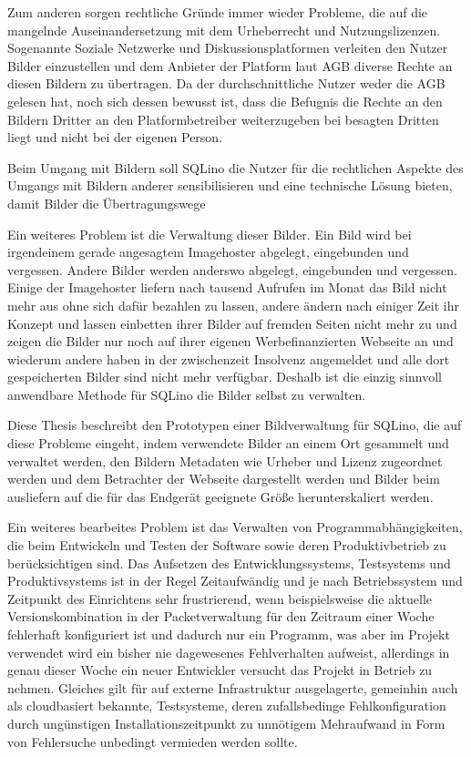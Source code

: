 Zum anderen sorgen rechtliche Gründe immer wieder Probleme, die auf die
mangelnde Auseinandersetzung mit dem Urheberrecht und Nutzungslizenzen.
Sogenannte Soziale Netzwerke und Diskussionsplatformen verleiten den Nutzer
Bilder einzustellen und dem Anbieter der Platform laut AGB diverse Rechte an
diesen Bildern zu übertragen. Da der durchschnittliche Nutzer weder die AGB
gelesen hat, noch sich dessen bewusst ist, dass die Befugnis die Rechte an den
Bildern Dritter an den Platformbetreiber weiterzugeben bei besagten Dritten
liegt und nicht bei der eigenen Person.

Beim Umgang mit Bildern soll SQLino die Nutzer für die rechtlichen Aspekte des
Umgangs mit Bildern anderer sensibilisieren und eine technische Lösung bieten,
damit Bilder die Übertragungswege 

Ein weiteres Problem ist die Verwaltung dieser Bilder. Ein Bild wird bei
irgendeinem gerade angesagtem Imagehoster abgelegt, eingebunden und vergessen.
Andere Bilder werden anderswo abgelegt, eingebunden und vergessen. Einige der
Imagehoster liefern nach tausend Aufrufen im Monat das Bild nicht mehr aus ohne
sich dafür bezahlen zu lassen, andere ändern nach einiger Zeit ihr Konzept und
lassen einbetten ihrer Bilder auf fremden Seiten nicht mehr zu und zeigen die
Bilder nur noch auf ihrer eigenen Werbefinanzierten Webseite an und wiederum
andere haben in der zwischenzeit Insolvenz angemeldet und alle dort
gespeicherten Bilder sind nicht mehr verfügbar. Deshalb ist die einzig sinnvoll
anwendbare Methode  für SQLino die Bilder
selbst zu verwalten.

Diese Thesis beschreibt den Prototypen einer Bildverwaltung für SQLino, die auf
diese Probleme eingeht, indem verwendete Bilder an einem Ort gesammelt und
verwaltet werden, den Bildern Metadaten wie Urheber und Lizenz zugeordnet
werden und dem Betrachter der Webseite dargestellt werden und Bilder beim
ausliefern auf die für das Endgerät geeignete Größe herunterskaliert werden.

Ein weiteres bearbeites Problem ist das Verwalten von Programmabhängigkeiten,
die beim Entwickeln und Testen der Software sowie deren Produktivbetrieb zu
berücksichtigen sind. Das Aufsetzen des Entwicklungssystems, Testsystems und
Produktivsystems ist in der Regel Zeitaufwändig und je nach Betriebssystem und
Zeitpunkt des Einrichtens sehr frustrierend, wenn beispielsweise die aktuelle
Versionskombination in der Packetverwaltung für den Zeitraum einer Woche
fehlerhaft konfiguriert ist und dadurch nur ein Programm, was aber im Projekt
verwendet wird ein bisher nie dagewesenes Fehlverhalten aufweist, allerdings in
genau dieser Woche ein neuer Entwickler versucht das Projekt in Betrieb zu
nehmen. Gleiches gilt für auf externe Infrastruktur ausgelagerte, gemeinhin auch
als cloudbasiert bekannte, Testsysteme, deren zufallsbedinge Fehlkonfiguration
durch ungünstigen Installationszeitpunkt zu unnötigem Mehraufwand in Form von
Fehlersuche unbedingt vermieden werden sollte.

